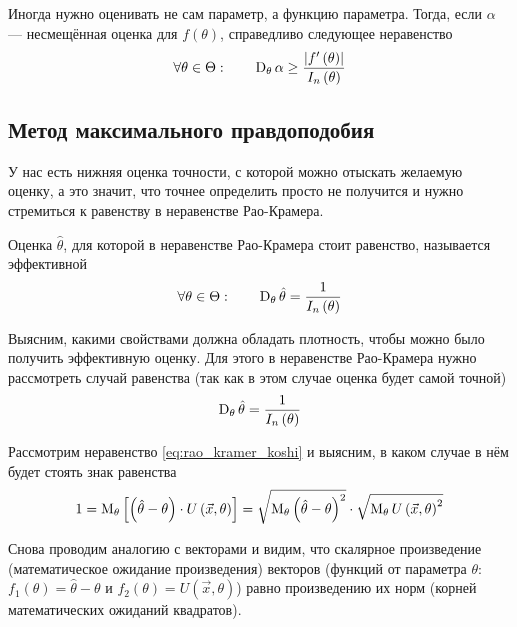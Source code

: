 \begin{remark}
  Иногда нужно оценивать не сам параметр, а функцию параметра.
  Тогда, если $\alpha$ --- несмещённая оценка для $f\left(\theta\right)$,
  справедливо следующее неравенство
  \begin{equation*}
    \forall \theta \in \Theta:\qquad
    \operatorname{D}_{\theta} \alpha
    \ge \frac{\left| f'\left( \theta \right) \right|}{I_n\left( \theta \right)}
  \end{equation*}
\end{remark}

\subsection{Метод максимального правдоподобия}
У нас есть нижняя оценка точности,
с которой можно отыскать желаемую оценку, а это значит,
что точнее определить просто не получится
и нужно стремиться к равенству в неравенстве Рао-Крамера.

\begin{definition}
  Оценка $\hat{\theta}$,
  для которой в неравенстве Рао-Крамера стоит равенство,
  называется эффективной
  \begin{equation*}
    \forall \theta \in \Theta: \qquad
    \operatorname{D}_{\theta} \hat{\theta} = \frac{1}{I_n\left( \theta \right)}
  \end{equation*}
\end{definition}

Выясним, какими свойствами должна обладать плотность,
чтобы можно было получить эффективную оценку.
Для этого в неравенстве Рао-Крамера нужно рассмотреть случай равенства
(так как в этом случае оценка будет самой точной)
  $$\operatorname{D}_{\theta} \hat{\theta}=\frac{1}{I_n\left(\theta\right)}$$

Рассмотрим неравенство \eqref{eq:rao_kramer_koshi} и выясним,
в каком случае в нём будет стоять знак равенства
  $$1 = \operatorname{M}_{\theta} 
    \left[\left(\hat{\theta}-\theta\right)
      \cdot U\left( \vec{x},\theta \right)\right]
    = \sqrt{\operatorname{M}_{\theta} 
    \left(\hat{\theta}-\theta\right)^2}
    \cdot\sqrt{\operatorname{M}_{\theta} U\left( \vec{x},\theta \right)^2}$$

Снова проводим аналогию с векторами и видим,
что скалярное произведение (математическое ожидание произведения)
векторов
(функций от параметра $\theta$:
$f_1\left( \theta \right)=\hat{\theta}-\theta$ и
$f_2\left( \theta \right)=U\left( \vec{x},\theta \right)$)
равно произведению их норм (корней математических ожиданий квадратов).

